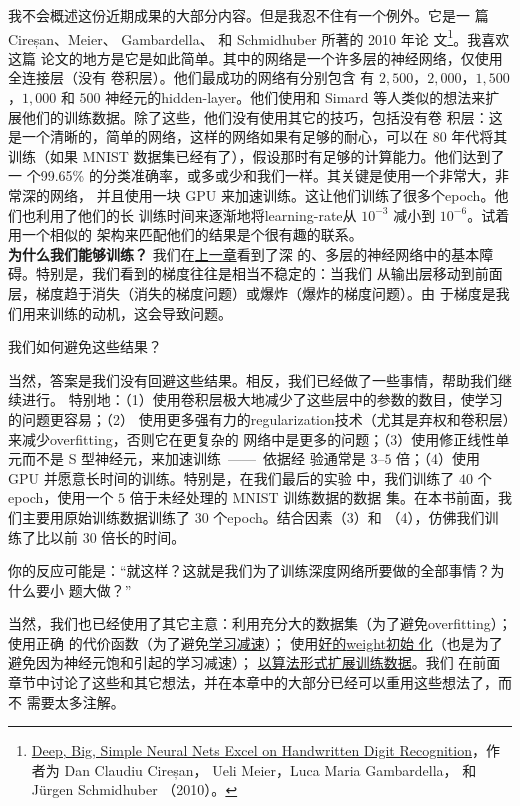 我不会概述这份近期成果的大部分内容。但是我忍不住有一个例外。它是一
篇 Cireșan、Meier、 Gambardella、 和 Schmidhuber 所著的 2010 年论
文\footnote{\href{http://arxiv.org/abs/1003.0358}{Deep, Big, Simple Neural Nets
    Excel on Handwritten Digit Recognition}，作者为 Dan Claudiu Cireșan， Ueli
  Meier，Luca Maria Gambardella， 和 Jürgen Schmidhuber （2010）。}。我喜欢这篇
论文的地方是它是如此简单。其中的网络是一个许多层的神经网络，仅使用全连接层（没有
卷积层）。他们最成功的网络有分别包含
有 $2,500$，$2,000$，$1,500$，$1,000$ 和 $500$ 神经元的\gls*{hidden-layer}。他们使用和 Simard
等人类似的想法来扩展他们的训练数据。除了这些，他们没有使用其它的技巧，包括没有卷
积层：这是一个清晰的，简单的网络，这样的网络如果有足够的耐心，可以在 80 年代将其
训练（如果 MNIST 数据集已经有了），假设那时有足够的计算能力。他们达到了一
个99.65\% 的分类准确率，或多或少和我们一样。其关键是使用一个非常大，非常深的网络，
并且使用一块 GPU 来加速训练。这让他们训练了很多个\gls*{epoch}。他们也利用了他们的长
训练时间来逐渐地将\gls*{learning-rate}从 $10^{-3}$ 减小到 $10^{-6}$。试着用一个相似的
架构来匹配他们的结果是个很有趣的联系。\\

\textbf{为什么我们能够训练？} 我们在\hyperref[ch:WhyHardToTrain]{上一章}看到了深
的、多层的神经网络中的基本障碍。特别是，我们看到的梯度往往是相当不稳定的：当我们
从输出层移动到前面层，梯度趋于消失（消失的梯度问题）或爆炸（爆炸的梯度问题）。由
于梯度是我们用来训练的动机，这会导致问题。

我们如何避免这些结果？

当然，答案是我们没有回避这些结果。相反，我们已经做了一些事情，帮助我们继续进行。
特别地：（1）使用卷积层极大地减少了这些层中的参数的数目，使学习的问题更容易；（2）
使用更多强有力的\gls*{regularization}技术（尤其是弃权和卷积层）来减少\gls*{overfitting}，否则它在更复杂的
网络中是更多的问题；（3）使用修正线性单元而不是 S 型神经元，来加速训练~——~依据经
验通常是 $3$--$5$ 倍；（4）使用 GPU 并愿意长时间的训练。特别是，在我们最后的实验
中，我们训练了 $40$ 个\gls*{epoch}，使用一个 $5$ 倍于未经处理的 MNIST 训练数据的数据
集。在本书前面，我们主要用原始训练数据训练了 $30$ 个\gls*{epoch}。结合因素（3）和
（4），仿佛我们训练了比以前 $30$ 倍长的时间。

你的反应可能是：“就这样？这就是我们为了训练深度网络所要做的全部事情？为什么要小
题大做？”

当然，我们也已经使用了其它主意：利用充分大的数据集（为了避免\gls*{overfitting}）；使用正确
的代价函数（为了避免\hyperref[sec:the_cross-entropy_cost_function]{学习减速}）；
使用\hyperref[how_to_choose_a_neural_network's_hyper-parameters]{好的\gls*{weight}初始
  化}（也是为了避免因为神经元饱和引起的学习减速）；%
\hyperref[sec:other_techniques_for_regularization]{以算法形式扩展训练数据}。我们
在前面章节中讨论了这些和其它想法，并在本章中的大部分已经可以重用这些想法了，而不
需要太多注解。

